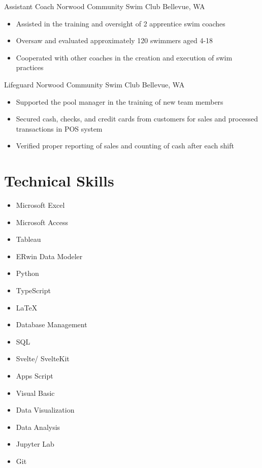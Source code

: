 \documentclass[10pt]{article}
\begin{document}
{Assistant Coach}
{Norwood Community Swim Club}
{Bellevue, WA}
{
    \begin{itemize}
        \item Assisted in the training and oversight of 2 apprentice swim coaches

        \item Oversaw and evaluated approximately 120 swimmers aged 4-18

        \item Cooperated with other coaches in the creation and execution of swim practices
    \end{itemize}
}

{Lifeguard}
{Norwood Community Swim Club}
{Bellevue, WA}
{
    \begin{itemize}
        \item Supported the pool manager in the training of new team members

        \item Secured cash, checks, and credit cards from customers for sales and processed transactions in POS system

        \item Verified proper reporting of sales and counting of cash after each shift
    \end{itemize}
}

\section{Technical Skills}
\begin{multicols}{4}
    \raggedright
    \begin{itemize}[leftmargin=3em]
        \item Microsoft Excel
        \item Microsoft Access
        \item Tableau
        \item ERwin Data Modeler
              \columnbreak
        \item Python
        \item TypeScript
        \item LaTeX
        \item Database Management
              \columnbreak
        \item SQL
        \item Svelte/ SvelteKit
        \item Apps Script
        \item Visual Basic
              \columnbreak
        \item Data Visualization
        \item Data Analysis
        \item Jupyter Lab
        \item Git
    \end{itemize}
\end{multicols}
\end{document}
